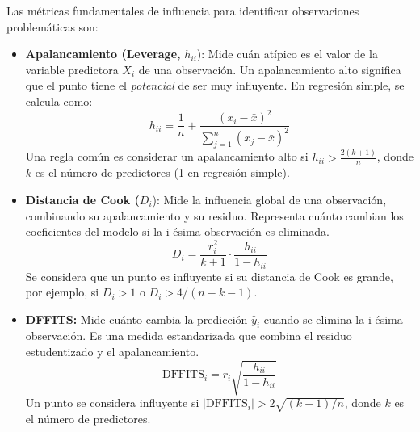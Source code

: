 \documentclass[
  letterpaper,
  DIV=11,
  numbers=noendperiod]{scrreprt}
\begin{document}
Las métricas fundamentales de influencia para identificar observaciones
problemáticas son:

\begin{itemize}
\item
  \textbf{Apalancamiento (Leverage,} \(h_{ii}\)): Mide cuán atípico es
  el valor de la variable predictora \(X_i\) de una observación. Un
  apalancamiento alto significa que el punto tiene el \emph{potencial}
  de ser muy influyente. En regresión simple, se calcula como:
  \[ h_{ii} = \frac{1}{n} + \frac{(x_i - \bar{x})^2}{\sum_{j=1}^{n}(x_j - \bar{x})^2} \]
  Una regla común es considerar un apalancamiento alto si
  \(h_{ii} > \frac{2(k+1)}{n}\), donde \(k\) es el número de predictores
  (1 en regresión simple).
\item
  \textbf{Distancia de Cook (}\(D_i\)): Mide la influencia global de una
  observación, combinando su apalancamiento y su residuo. Representa
  cuánto cambian los coeficientes del modelo si la i-ésima observación
  es eliminada.
  \[ D_i = \frac{r_i^2}{k+1} \cdot \frac{h_{ii}}{1-h_{ii}} \] Se
  considera que un punto es influyente si su distancia de Cook es
  grande, por ejemplo, si \(D_i > 1\) o \(D_i > 4/(n-k-1)\).
\item
  \textbf{DFFITS:} Mide cuánto cambia la predicción \(\hat{y}_i\) cuando
  se elimina la i-ésima observación. Es una medida estandarizada que
  combina el residuo estudentizado y el apalancamiento.
  \[ \text{DFFITS}_i = r_i \sqrt{\frac{h_{ii}}{1-h_{ii}}} \] Un punto se
  considera influyente si \(|\text{DFFITS}_i| > 2\sqrt{(k+1)/n}\), donde
  \(k\) es el número de predictores.
\end{itemize}
\end{document}
